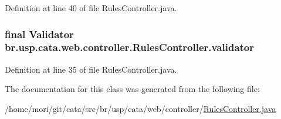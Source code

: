 Definition at line 40 of file Rules\+Controller.\+java.

\hypertarget{classbr_1_1usp_1_1cata_1_1web_1_1controller_1_1_rules_controller_ad401152db4ca88b16db6af85f197c9e2}{
\subsubsection[{validator}]{\setlength{\rightskip}{0pt plus 5cm}final Validator br.\+usp.\+cata.\+web.\+controller.\+Rules\+Controller.\+validator\hspace{0.3cm}{\ttfamily [private]}}}\label{classbr_1_1usp_1_1cata_1_1web_1_1controller_1_1_rules_controller_ad401152db4ca88b16db6af85f197c9e2}


Definition at line 35 of file Rules\+Controller.\+java.



The documentation for this class was generated from the following file\+:\begin{DoxyCompactItemize}
\item 
/home/mori/git/cata/src/br/usp/cata/web/controller/\hyperlink{_rules_controller_8java}{Rules\+Controller.\+java}\end{DoxyCompactItemize}
